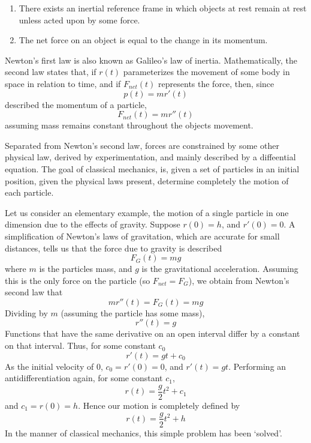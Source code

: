 \begin{enumerate}
    \item There exists an inertial reference frame in which objects at rest remain at rest unless acted upon by some force.
    \item The net force on an object is equal to the change in its momentum.
\end{enumerate}

Newton's first law is also known as Galileo's law of inertia. Mathematically, the second law states that, if $r(t)$ parameterizes the movement of some body in space in relation to time, and if $F_{net}(t)$ represents the force, then, since
%
\[ p(t) = mr'(t) \]
%
described the momentum of a particle,
%
\[ F_{net}(t) = mr''(t) \]
%
assuming mass remains constant throughout the objects movement.

Separated from Newton's second law, forces are constrained by some other physical law, derived by experimentation, and mainly described by a diffeential equation. The goal of classical mechanics, is, given a set of particles in an initial position, given the physical laws present, determine completely the motion of each particle.

Let us consider an elementary example, the motion of a single particle in one dimension due to the effects of gravity. Suppose $r(0) = h$, and $r'(0) = 0$. A simplification of Newton's laws of gravitation, which are accurate for small distances, tells us that the force due to gravity is described
%
\[ F_G(t) = mg \]
%
where $m$ is the particles mass, and $g$ is the gravitational acceleration. Assuming this is the only force on the particle (so $F_{net} = F_G$), we obtain from Newton's second law that
%
\[ mr''(t) = F_G(t) = mg \]
%
Dividing by $m$ (assuming the particle has some mass),
%
\[ r''(t) = g \]
%
Functions that have the same derivative on an open interval differ by a constant on that interval. Thus, for some constant $c_0$
%
\[ r'(t) = gt + c_0 \]
%
As the initial velocity of $0$, $c_0 = r'(0) = 0$, and $r'(t) = gt$. Performing an antidifferentiation again, for some constant $c_1$,
%
\[ r(t) = \frac{g}{2}t^2 + c_1 \]
%
and $c_1 = r(0) = h$. Hence our motion is completely defined by
%
\[ r(t) = \frac{g}{2}t^2 + h \]
%
In the manner of classical mechanics, this simple problem has been `solved'.

